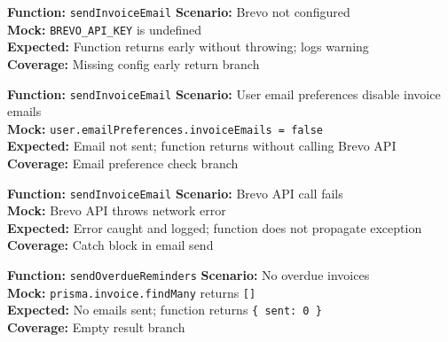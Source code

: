 ﻿\documentclass[12pt,a4paper]{report}
\newcommand{\ptwo}{\textbf{\color{p2orange}P2}}
\begin{document}
\begin{tcolorbox}[testbox,title={EMAIL-001 \hfill \ptwo}]
\textbf{Function:} \texttt{sendInvoiceEmail} \quad \textbf{Scenario:} Brevo not configured \\
\textbf{Mock:} \texttt{BREVO\_API\_KEY} is undefined \\
\textbf{Expected:} Function returns early without throwing; logs warning \\
\textbf{Coverage:} Missing config early return branch
\end{tcolorbox}

\begin{tcolorbox}[testbox,title={EMAIL-002 \hfill \ptwo}]
\textbf{Function:} \texttt{sendInvoiceEmail} \quad \textbf{Scenario:} User email preferences disable invoice emails \\
\textbf{Mock:} \texttt{user.emailPreferences.invoiceEmails = false} \\
\textbf{Expected:} Email not sent; function returns without calling Brevo API \\
\textbf{Coverage:} Email preference check branch
\end{tcolorbox}

\begin{tcolorbox}[testbox,title={EMAIL-003 \hfill \ptwo}]
\textbf{Function:} \texttt{sendInvoiceEmail} \quad \textbf{Scenario:} Brevo API call fails \\
\textbf{Mock:} Brevo API throws network error \\
\textbf{Expected:} Error caught and logged; function does not propagate exception \\
\textbf{Coverage:} Catch block in email send
\end{tcolorbox}

\begin{tcolorbox}[testbox,title={EMAIL-004 \hfill \ptwo}]
\textbf{Function:} \texttt{sendOverdueReminders} \quad \textbf{Scenario:} No overdue invoices \\
\textbf{Mock:} \texttt{prisma.invoice.findMany} returns \texttt{[]} \\
\textbf{Expected:} No emails sent; function returns \texttt{\{ sent: 0 \}} \\
\textbf{Coverage:} Empty result branch
\end{tcolorbox}

\end{document}
